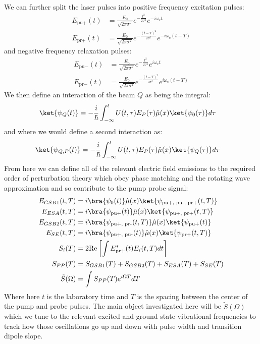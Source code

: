 We can further split the laser pulses into positive frequency excitation pulses:
\begin{align}
	E_{\text{pu}+}(t) &= \frac{E_0}{\sqrt{2 \pi \sigma^2}} e^{-\frac{t^2}{2 \sigma^2} } e^{-i \omega_c t} \\
	E_{\text{pr}+}(t) &= \frac{E_0}{\sqrt{2 \pi \sigma^2}} e^{-\frac{\left(t-T\right)^2}{2 \sigma^2} }  e^{-i \omega_c \left(t-T\right)}
\end{align}
and negative frequency relaxation pulses:
\begin{align}
	E_{\text{pu}-}(t) &= \frac{E_0}{\sqrt{2 \pi \sigma^2}} e^{-\frac{t^2}{2 \sigma^2} } e^{i \omega_c t} \\
	E_{\text{pr}-}(t) &= \frac{E_0}{\sqrt{2 \pi \sigma^2}} e^{-\frac{\left(t-T\right)^2}{2 \sigma^2} }  e^{i \omega_c \left(t-T\right)}
\end{align}
We then define an interaction of the beam $Q$ as being the integral:
\begin{align}
	\ket{\psi_{Q} (t)}  &= -\frac{i}{\hbar} \int_{-\infty}^{t} U(t, \tau) E_{P}(\tau) \hat{\mu}(x) \ket{\psi_0 (\tau)} d \tau
\end{align}
and where we would define a second interaction as:
\begin{align}
	\ket{\psi_{Q, P} (t)}  &= -\frac{i}{\hbar} \int_{-\infty}^{t} U(t, \tau) E_P (\tau) \hat{\mu}(x) \ket{\psi_Q (\tau)} d \tau
\end{align}
From here we can define all of the relevant electric field emissions to the required order of perturbation theory which obey phase matching and the rotating wave approximation and so contribute to the pump probe signal:
\begin{align*}
	E_{GSB1} (t, T) &=  i \bra{\psi_{0} (t)} \hat{\mu} (x) \ket{\psi_{\text{pu+, pu-, pr+}} (t, T)}\\
	E_{ESA} (t, T) &=  i \bra{\psi_{\text{pu+}} (t)} \hat{\mu} (x) \ket{\psi_{\text{pu+, pr+}} (t, T)}\\
	E_{GSB2} (t, T) &=  i \bra{\psi_{\text{pu+, pr-}} (t, T)} \hat{\mu} (x) \ket{\psi_{\text{pu+}} (t)}\\
	E_{SE} (t, T) &=  i \bra{\psi_{\text{pu+, pu-}} (t)} \hat{\mu} (x) \ket{\psi_{\text{pr+}} (t, T)} \\
	S_{i} (T) &= 2 \text{Re} \left[ \int E^*_{\text{pr+}} (t) E_i (t, T) dt  \right] \\
	S_{PP} (T) &= S_{GSB1} (T) + S_{GSB2} (T) + S_{ESA} (T) + S_{SE} (T) \\
	\tilde{S}(\Omega) &= \int S_{PP} (T) e^{i \Omega T} d T
\end{align*}
Where here $t$ is the laboratory time and $T$ is the spacing between the center of the pump and probe pulses.  The main object investigated here will be $\tilde{S}(\Omega)$ which we tune to the relevant excited and ground state vibrational frequencies to track how those oscillations go up and down with pulse width and transition dipole slope.

